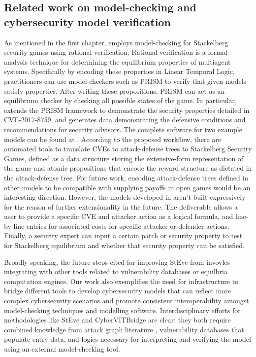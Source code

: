 \subsection{Related work on model-checking and cybersecurity model verification}
As mentioned in the first chapter, \cite{Phetmanee2024} employs model-checking for Stackelberg security games using rational verification. Rational verification is a formal-analysis technique for determining the equilibrium properties of multiagent systems. Specifically by encoding these properties in Linear Temporal Logic, practitioners can use model-checkers such as PRISM to verify that given models satisfy properties. After writing these propositions, PRISM can act as an equilibrium checker by checking all possible states of the game. In particular, \cite{Phetmanee2024} extends the PRISM framework to demonstrate the security properties detailed in CVE-2017-8759, and generates data demonstrating the defensive conditions and recommendations for security advisors. The complete software for two example models can be found at \cite{phetmanee_2024_13338608}. According to the proposed workflow, there are automated tools to translate CVEs to attack-defense trees to Stackelberg Security Games, defined as a data structure storing the extensive-form representation of the game and atomic propositions that encode the reward structure as dictated in the attack-defense tree. For future work, encoding attack-defense trees defined in other models to be compatible with supplying payoffs in open games would be an interesting direction. However, the models developed in \cite{Phetmanee2024} aren't built expressively for the reason of further extensionality in the future. The deliverable allows a user to provide a specific CVE and attacker action as a logical formula, and line-by-line entries for associated costs for specific attacker or defender actions. Finally, a security expert can input a certain patch or security property to test for Stackelberg equilibrium and whether that security property can be satisfied. 

Broadly speaking, the future steps cited for improving StEve from \cite{Phetmanee2024} invovles integrating with other tools related to vulnerability databases or equilbria computation engines. Our work also exemplifies the need for infrastructure to bridge different tools to develop cybersecurity models that can reflect more complex cybersecurity scenarios and promote consistent interoperability amongst model-checking techniques and modelling software. Interdisciplinary efforts for methodologies like StEve and CyberVITBridge are clear: they both require combined knowledge from attack graph literature \cite{zenitaniAttackGraphAnalysis2023}, vulnerability databases that populate entry data, and logics necessary for interpreting and verifying the model using an external model-checking tool. 
